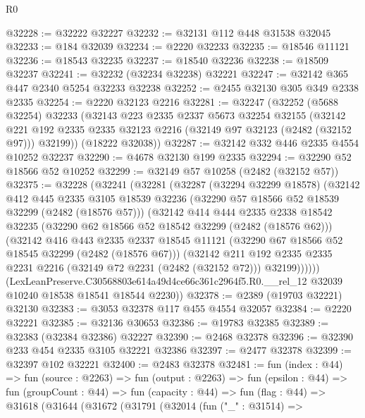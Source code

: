 \begin{lexlean}{R0}
\begin{coremodule}
@32228 := @32222 @32227
@32232 := @32131 @112 @448 @31538 @32045
@32233 := @184 @32039
@32234 := @2220 @32233
@32235 := @18546 @11121
@32236 := @18543 @32235
@32237 := @18540 @32236
@32238 := @18509 @32237
@32241 := @32232 (@32234 @32238) @32221
@32247 := @32142 @365 @447 @2340 @5254 @32233 @32238
@32252 := @2455 @32130 @305 @349 @2338 @2335
@32254 := @2220 @32123 @2216
@32281 := @32247
    (@32252
      (@5688 @32254)
      @32233
      (@32143
        @223
        @2335
        @2337
        @5673
        @32254
        @32155
        (@32142 @221 @192 @2335 @2335 @32123 @2216 (@32149 @97 @32123 (@2482 (@32152 @97))) @32199))
      (@18222 @32038))
@32287 := @32142 @332 @446 @2335 @4554 @10252 @32237
@32290 := @4678 @32130 @199 @2335
@32294 := @32290 @52 @18566 @52 @10252
@32299 := @32149 @57 @10258 (@2482 (@32152 @57))
@32375 := @32228
    (@32241
      (@32281
        (@32287
          (@32294 @32299 @18578)
          (@32142
            @412
            @445
            @2335
            @3105
            @18539
            @32236
            (@32290 @57 @18566 @52 @18539 @32299 (@2482 (@18576 @57)))
            (@32142
              @414
              @444
              @2335
              @2338
              @18542
              @32235
              (@32290 @62 @18566 @52 @18542 @32299 (@2482 (@18576 @62)))
              (@32142
                @416
                @443
                @2335
                @2337
                @18545
                @11121
                (@32290 @67 @18566 @52 @18545 @32299 (@2482 (@18576 @67)))
                (@32142
                  @211
                  @192
                  @2335
                  @2335
                  @2231
                  @2216
                  (@32149 @72 @2231 (@2482 (@32152 @72)))
                  @32199))))))
      (LexLeanPreserve.C30568803e614a49d4ce66c361c2964f5.R0.__rel_12
        @32039
        @10240
        @18538
        @18541
        @18544
        @2230))
@32378 := @2389 (@19703 @32221) @32130
@32383 := @3053 @32378 @117 @455 @4554 @32057
@32384 := @2220 @32221
@32385 := @32136 @30653
@32386 := @19783 @32385
@32389 := @32383 (@32384 @32386) @32227
@32390 := @2468 @32378
@32396 := @32390 @233 @454 @2335 @3105 @32221 @32386
@32397 := @2477 @32378
@32399 := @32397 @102 @32221
@32400 := @2483 @32378
@32481 := fun (index : @44) =>
  fun (source : @2263) =>
  fun (output : @2263) =>
  fun (epsilon : @44) =>
  fun (groupCount : @44) =>
  fun (capacity : @44) =>
  fun (flag : @44) =>
  @31618
    (@31644
      (@31672
        (@31791
          (@32014
            (fun ("_" : @31514) =>

\end{coremodule}
\end{lexlean}
